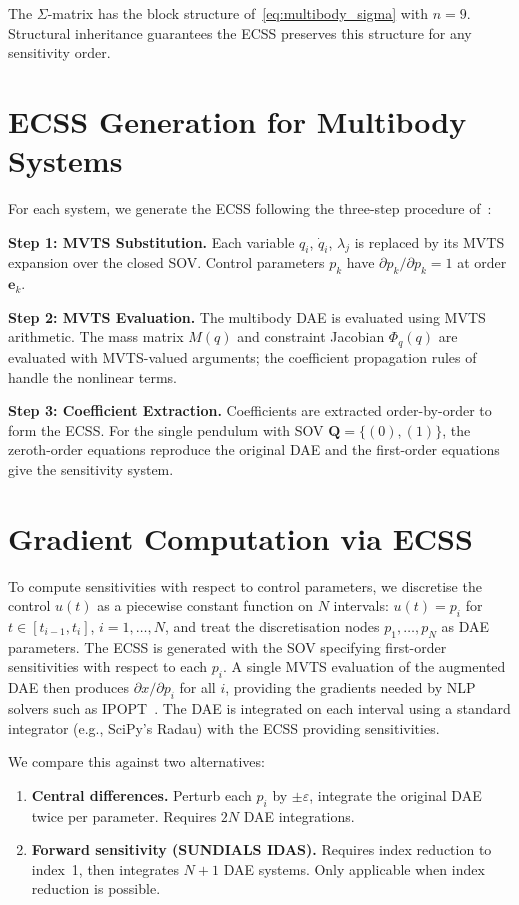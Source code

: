 \documentclass[12pt,a4paper]{article}
\theoremstyle{definition}
\theoremstyle{plain}
\newcommand{\vQ}{\mathbf{Q}}
\begin{document}
The $\Sigma$-matrix has the block structure of~\eqref{eq:multibody_sigma} with $n=9$. Structural inheritance guarantees the ECSS preserves this structure for any sensitivity order.

\section{ECSS Generation for Multibody Systems}
\label{sec:ecss_generation}

For each system, we generate the ECSS following the three-step procedure of~\cite{cao2026builder}:

\textbf{Step 1: MVTS Substitution.} Each variable $q_i$, $\dot{q}_i$, $\lambda_j$ is replaced by its MVTS expansion over the closed SOV. Control parameters $p_k$ have $\partial p_k/\partial p_k = 1$ at order $\mathbf{e}_k$.

\textbf{Step 2: MVTS Evaluation.} The multibody DAE is evaluated using MVTS arithmetic. The mass matrix $M(q)$ and constraint Jacobian $\Phi_q(q)$ are evaluated with MVTS-valued arguments; the coefficient propagation rules of~\cite{cao2026builder} handle the nonlinear terms.

\textbf{Step 3: Coefficient Extraction.} Coefficients are extracted order-by-order to form the ECSS. For the single pendulum with SOV $\vQ=\{(0),(1)\}$, the zeroth-order equations reproduce the original DAE and the first-order equations give the sensitivity system.

\section{Gradient Computation via ECSS}
\label{sec:control}

To compute sensitivities with respect to control parameters, we discretise the control $u(t)$ as a piecewise constant function on $N$ intervals: $u(t)=p_i$ for $t\in[t_{i-1},t_i]$, $i=1,\dots,N$, and treat the discretisation nodes $p_1,\dots,p_N$ as DAE parameters. The ECSS is generated with the SOV specifying first-order sensitivities with respect to each $p_i$. A single MVTS evaluation of the augmented DAE then produces $\partial x/\partial p_i$ for all $i$, providing the gradients needed by NLP solvers such as IPOPT~\cite{wachter2006implementation}. The DAE is integrated on each interval using a standard integrator (e.g., SciPy's Radau) with the ECSS providing sensitivities.

We compare this against two alternatives:
\begin{enumerate}[nosep]
  \item \textbf{Central differences.} Perturb each $p_i$ by $\pm\varepsilon$, integrate the original DAE twice per parameter. Requires $2N$ DAE integrations.
  \item \textbf{Forward sensitivity (SUNDIALS IDAS).} Requires index reduction to index~1, then integrates $N+1$ DAE systems. Only applicable when index reduction is possible.
\end{enumerate}
\end{document}
